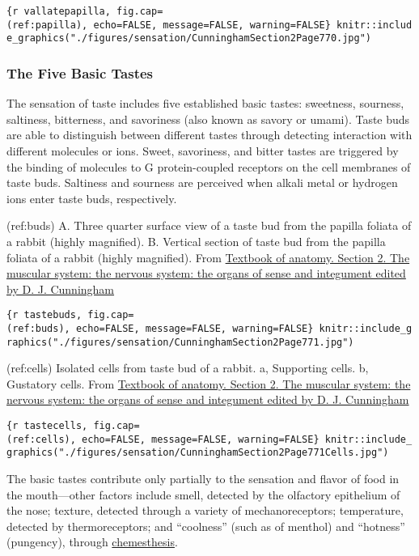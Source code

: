 \texttt{\{r\ vallatepapilla,\ fig.cap=\textquotesingle{}(ref:papilla)\textquotesingle{},\ echo=FALSE,\ message=FALSE,\ warning=FALSE\}\ knitr::include\_graphics("./figures/sensation/CunninghamSection2Page770.jpg")}

\hypertarget{the-five-basic-tastes}{%
\subsubsection{The Five Basic Tastes}\label{the-five-basic-tastes}}

The sensation of taste includes five established basic tastes:
sweetness, sourness, saltiness, bitterness, and savoriness (also known
as savory or umami). Taste buds are able to distinguish between
different tastes through detecting interaction with different molecules
or ions. Sweet, savoriness, and bitter tastes are triggered by the
binding of molecules to G protein-coupled receptors on the cell
membranes of taste buds. Saltiness and sourness are perceived when
alkali metal or hydrogen ions enter taste buds, respectively.

(ref:buds) A. Three quarter surface view of a taste bud from the papilla
foliata of a rabbit (highly magnified). B. Vertical section of taste bud
from the papilla foliata of a rabbit (highly magnified). From
\href{https://wellcomelibrary.org/item/b21271070}{Textbook of anatomy.
Section 2. The muscular system: the nervous system: the organs of sense
and integument edited by D. J. Cunningham}

\texttt{\{r\ tastebuds,\ fig.cap=\textquotesingle{}(ref:buds)\textquotesingle{},\ echo=FALSE,\ message=FALSE,\ warning=FALSE\}\ knitr::include\_graphics("./figures/sensation/CunninghamSection2Page771.jpg")}

(ref:cells) Isolated cells from taste bud of a rabbit. a, Supporting
cells. b, Gustatory cells. From
\href{https://wellcomelibrary.org/item/b21271070}{Textbook of anatomy.
Section 2. The muscular system: the nervous system: the organs of sense
and integument edited by D. J. Cunningham}

\texttt{\{r\ tastecells,\ fig.cap=\textquotesingle{}(ref:cells)\textquotesingle{},\ echo=FALSE,\ message=FALSE,\ warning=FALSE\}\ knitr::include\_graphics("./figures/sensation/CunninghamSection2Page771Cells.jpg")}

The basic tastes contribute only partially to the sensation and flavor
of food in the mouth---other factors include smell, detected by the
olfactory epithelium of the nose; texture, detected through a variety of
mechanoreceptors; temperature, detected by thermoreceptors; and
``coolness'' (such as of menthol) and ``hotness'' (pungency), through
\href{https://en.wikipedia.org/wiki/Chemesthesis}{chemesthesis}.

